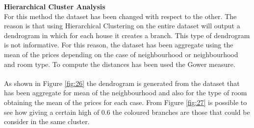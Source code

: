 \documentclass{FR16}
\begin{document}
\newpage
\noindent \textbf{Hierarchical Cluster Analysis}\\
For  this method the dataset has been changed with respect to the other. The reason is that using Hierarchical Clustering on the entire dataset will output a dendrogram  in which for each house it creates a branch. This type of dendrogram is not informative. For this reason, the dataset has been aggregate using the mean of the prices depending on the case of neighbourhood or neighbourhood and room type. To compute the distances has been used the Gower measure. 
\\\\
\noindent  As shown in Figure \ref{fig:26} the dendrogram  is generated from the dataset that has been aggregate for mean of the neighbourhood and also for the type of room obtaining the mean of the prices for each case. From Figure \ref{fig:27} is possible to see how giving a certain  high of 0.6 the coloured branches are those that could be consider in the same cluster. 
\end{document}
